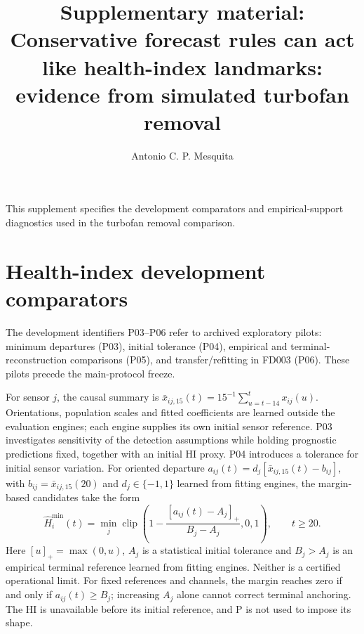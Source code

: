 \documentclass[12pt]{article}
\title{Supplementary material: Conservative forecast rules can act like health-index landmarks: evidence from simulated turbofan removal}
\author{Antonio C. P. Mesquita}
\date{}
\begin{document}
\maketitle
This supplement specifies the development comparators and empirical-support diagnostics used in the turbofan removal comparison.
\section{Health-index development comparators}
The development identifiers P03--P06 refer to archived exploratory pilots: minimum departures (P03), initial tolerance (P04), empirical and terminal-reconstruction comparisons (P05), and transfer/refitting in FD003 (P06). These pilots precede the main-protocol freeze.

For sensor $j$, the causal summary is $\bar x_{ij,15}(t)=15^{-1}\sum_{u=t-14}^{t}x_{ij}(u)$. Orientations, population scales and fitted coefficients are learned outside the evaluation engines; each engine supplies its own initial sensor reference. P03 investigates sensitivity of the detection assumptions while holding prognostic predictions fixed, together with an initial HI proxy. P04 introduces a tolerance for initial sensor variation. For oriented departure $a_{ij}(t)=d_j[\bar x_{ij,15}(t)-b_{ij}]$, with $b_{ij}=\bar x_{ij,15}(20)$ and $d_j\in\{-1,1\}$ learned from fitting engines, the margin-based candidates take the form
\[
\widehat H_i^{\min}(t)=\min_j\operatorname{clip}
\left(1-\frac{[a_{ij}(t)-A_j]_+}{B_j-A_j},0,1\right),
\qquad t\geq20.
\]
Here $[u]_+=\max(0,u)$, $A_j$ is a statistical initial tolerance and $B_j>A_j$ is an empirical terminal reference learned from fitting engines. Neither is a certified operational limit. For fixed references and channels, the margin reaches zero if and only if $a_{ij}(t)\geq B_j$; increasing $A_j$ alone cannot correct terminal anchoring. The HI is unavailable before its initial reference, and P is not used to impose its shape.
\end{document}
